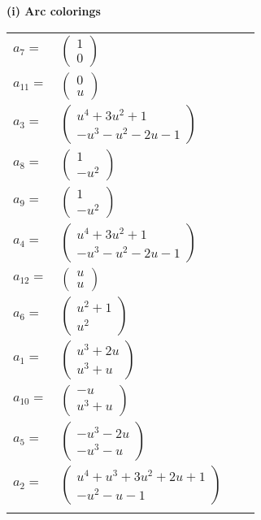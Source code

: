 \documentclass[1p]{elsarticle_modified}
\theoremstyle{definition}
\begin{document}
\flushleft \textbf{(i) Arc colorings}\\
\begin{tabular}{m{7pt} m{180pt} m{7pt} m{180pt} }
\flushright $a_{7}=$&$\begin{pmatrix}1\\0\end{pmatrix}$ \\
\flushright $a_{11}=$&$\begin{pmatrix}0\\u\end{pmatrix}$ \\
\flushright $a_{3}=$&$\begin{pmatrix}u^4+3 u^2+1\\- u^3- u^2-2 u-1\end{pmatrix}$ \\
\flushright $a_{8}=$&$\begin{pmatrix}1\\- u^2\end{pmatrix}$ \\
\flushright $a_{9}=$&$\begin{pmatrix}1\\- u^2\end{pmatrix}$ \\
\flushright $a_{4}=$&$\begin{pmatrix}u^4+3 u^2+1\\- u^3- u^2-2 u-1\end{pmatrix}$ \\
\flushright $a_{12}=$&$\begin{pmatrix}u\\u\end{pmatrix}$ \\
\flushright $a_{6}=$&$\begin{pmatrix}u^2+1\\u^2\end{pmatrix}$ \\
\flushright $a_{1}=$&$\begin{pmatrix}u^3+2 u\\u^3+u\end{pmatrix}$ \\
\flushright $a_{10}=$&$\begin{pmatrix}- u\\u^3+u\end{pmatrix}$ \\
\flushright $a_{5}=$&$\begin{pmatrix}- u^3-2 u\\- u^3- u\end{pmatrix}$ \\
\flushright $a_{2}=$&$\begin{pmatrix}u^4+u^3+3 u^2+2 u+1\\- u^2- u-1\end{pmatrix}$\\&\end{tabular}
\end{document}
